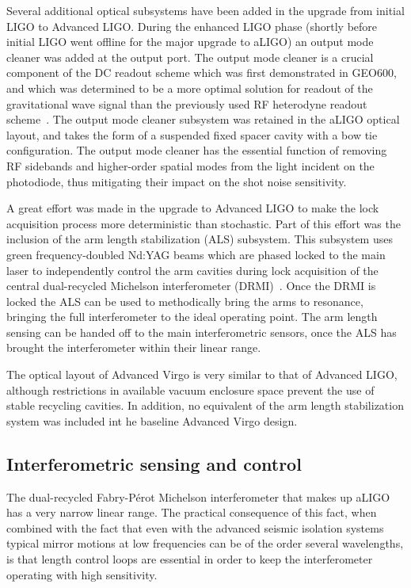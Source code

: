 Several additional optical subsystems have been added in the upgrade from initial LIGO to Advanced LIGO. 
During the enhanced LIGO phase (shortly before initial LIGO went offline for the major upgrade to aLIGO) an output
mode cleaner was added at the output port. The output mode cleaner is a crucial component of the DC readout 
scheme which was first demonstrated in GEO600, and which was determined to be a more optimal solution for 
readout of the gravitational wave signal than the previously used RF heterodyne readout scheme~\cite{DCreadout}. The output mode cleaner subsystem was retained in the aLIGO optical layout, and takes the form of a suspended fixed spacer cavity with a bow tie configuration.
The output mode cleaner has the essential function of removing RF sidebands and higher-order spatial modes from the light incident on the photodiode, thus mitigating their impact on the shot noise sensitivity. 

A great effort was made in the upgrade to Advanced LIGO to make the lock acquisition process more deterministic than stochastic.
Part of this effort was the inclusion of the arm length stabilization (ALS) subsystem.
This subsystem uses green frequency-doubled Nd:YAG beams which are phased locked to the main laser to independently control the arm cavities during lock acquisition of the central dual-recycled Michelson interferometer (DRMI)~\cite{Staley2014}.
Once the DRMI is locked the ALS can be used to methodically bring the arms to resonance, bringing the full interferometer to the ideal operating point. 
The arm length sensing can be handed off to the main interferometric sensors, once the ALS has brought the interferometer within their linear range.

The optical layout of Advanced Virgo is very similar to that of Advanced LIGO, although restrictions in available vacuum enclosure space prevent the use of stable recycling cavities. In addition, no equivalent of the arm length stabilization system was included int he baseline Advanced Virgo design.

\subsection{Interferometric sensing and control}
The dual-recycled Fabry-P\'{e}rot Michelson interferometer that makes up aLIGO has a very narrow linear range. 
The practical consequence of this fact, when combined with the fact that even with the advanced seismic isolation systems typical 
mirror motions at low frequencies can be of the order several wavelengths, is that length control loops are essential in order 
to keep the interferometer operating with high sensitivity. 

